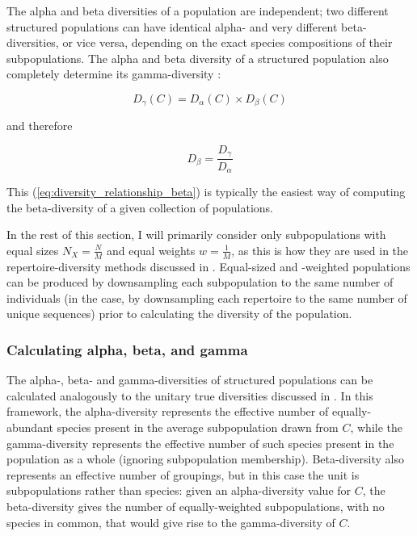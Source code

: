 \noindent The alpha and beta diversities of a population are independent; two different structured populations can have identical alpha- and very different beta-diversities, or vice versa, depending on the exact species compositions of their subpopulations. The alpha and beta diversity of a structured population also completely determine its gamma-diversity \citep{jost2007partitioning}:

\begin{equation}
D_\gamma(C) = D_\alpha(C) \times D_\beta(C)
\label{eq:diversity_relationship_gamma}
\end{equation}

and therefore 

\begin{equation}
D_\beta = \frac{D_\gamma}{D_\alpha}
\label{eq:diversity_relationship_beta}
\end{equation}

\noindent This (\autoref{eq:diversity_relationship_beta}) is typically the easiest way of computing the beta-diversity of a given collection of populations.

In the rest of this section, I will primarily consider only subpopulations with equal sizes $N_X = \frac{N}{M}$ and equal weights $w = \frac{1}{M}$, as this is how they are used in the repertoire-diversity methods discussed in . Equal-sized and -weighted populations can be produced by downsampling each subpopulation to the same number of individuals (in the \igseq case, by downsampling each repertoire to the same number of unique sequences) prior to calculating the diversity of the population.
 
\subsubsection{Calculating alpha, beta, and gamma}
\label{sec:diversity-structured-calc}

The alpha-, beta- and gamma-diversities of structured populations can be calculated analogously to the unitary true diversities discussed in . In this framework, the alpha-diversity represents the effective number of equally-abundant species present in the average subpopulation drawn from $C$, while the gamma-diversity represents the effective number of such species present in the population as a whole (ignoring subpopulation membership). Beta-diversity also represents an effective number of groupings, but in this case the unit is subpopulations rather than species: given an alpha-diversity value for $C$, the beta-diversity gives the number of equally-weighted subpopulations, with no species in common, that would give rise to the gamma-diversity of $C$.

